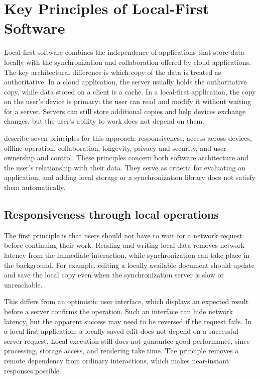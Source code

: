 \section{Key Principles of Local-First Software}
\label{sec:key-principles-of-local-first-software}

Local-first software combines the independence of applications that store data locally with the synchronization and collaboration offered by cloud applications.
The key architectural difference is which copy of the data is treated as authoritative.
In a cloud application, the server usually holds the authoritative copy, while data stored on a client is a cache.
In a local-first application, the copy on the user's device is primary: the user can read and modify it without waiting for a server.
Servers can still store additional copies and help devices exchange changes, but the user's ability to work does not depend on them.
\parencite{local-first-software}

\textcite{local-first-software} describe seven principles for this approach: responsiveness, access across devices, offline operation, collaboration, longevity, privacy and security, and user ownership and control.
These principles concern both software architecture and the user's relationship with their data.
They serve as criteria for evaluating an application, and adding local storage or a synchronization library does not satisfy them automatically.

\subsection{Responsiveness through local operations}

The first principle is that users should not have to wait for a network request before continuing their work.
Reading and writing local data removes network latency from the immediate interaction, while synchronization can take place in the background.
For example, editing a locally available document should update and save the local copy even when the synchronization server is slow or unreachable.
\parencite{local-first-software}

This differs from an optimistic user interface, which displays an expected result before a server confirms the operation.
Such an interface can hide network latency, but the apparent success may need to be reversed if the request fails.
In a local-first application, a locally saved edit does not depend on a successful server request.
Local execution still does not guarantee good performance, since processing, storage access, and rendering take time.
The principle removes a remote dependency from ordinary interactions, which makes near-instant responses possible.
\parencite{local-first-software}

